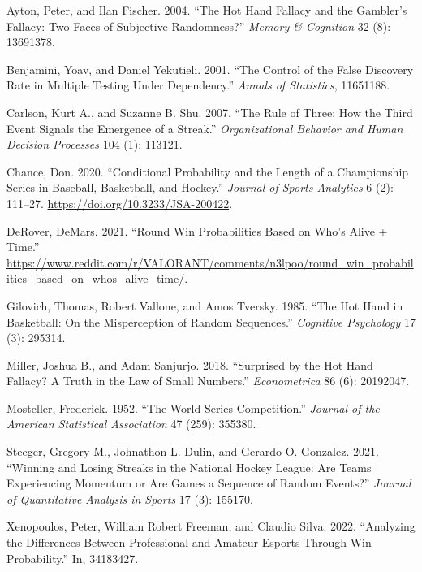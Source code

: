 \documentclass{article}
\newlength{\cslhangindent}
\newlength{\cslentryspacingunit} %
\newenvironment{CSLReferences}[2] %
 {%
  \setlength{\parindent}{0pt}
  \ifodd #1
  \let\oldpar\par
  \def\par{\hangindent=\cslhangindent\oldpar}
  \fi
  \setlength{\parskip}{#2\cslentryspacingunit}
 }%
 {}
\begin{document}
\hypertarget{refs}{}
\begin{CSLReferences}{1}{0}
\leavevmode{}%
Ayton, Peter, and Ilan Fischer. 2004. {``The Hot Hand Fallacy and the
Gambler{'}s Fallacy: Two Faces of Subjective Randomness?''} \emph{Memory
\& Cognition} 32 (8): 13691378.

\leavevmode{}%
Benjamini, Yoav, and Daniel Yekutieli. 2001. {``The Control of the False
Discovery Rate in Multiple Testing Under Dependency.''} \emph{Annals of
Statistics}, 11651188.

\leavevmode{}%
Carlson, Kurt A., and Suzanne B. Shu. 2007. {``The Rule of Three: How
the Third Event Signals the Emergence of a Streak.''}
\emph{Organizational Behavior and Human Decision Processes} 104 (1):
113121.

\leavevmode{}%
Chance, Don. 2020. {``Conditional Probability and the Length of a
Championship Series in Baseball, Basketball, and Hockey.''}
\emph{Journal of Sports Analytics} 6 (2): 111--27.
\url{https://doi.org/10.3233/JSA-200422}.

\leavevmode{}%
DeRover, DeMars. 2021. {``Round Win Probabilities Based on Who's Alive +
Time.''}
\url{https://www.reddit.com/r/VALORANT/comments/n3lpoo/round_win_probabilities_based_on_whos_alive_time/}.

\leavevmode{}%
Gilovich, Thomas, Robert Vallone, and Amos Tversky. 1985. {``The Hot
Hand in Basketball: On the Misperception of Random Sequences.''}
\emph{Cognitive Psychology} 17 (3): 295314.

\leavevmode{}%
Miller, Joshua B., and Adam Sanjurjo. 2018. {``Surprised by the Hot Hand
Fallacy? A Truth in the Law of Small Numbers.''} \emph{Econometrica} 86
(6): 20192047.

\leavevmode{}%
Mosteller, Frederick. 1952. {``The World Series Competition.''}
\emph{Journal of the American Statistical Association} 47 (259): 355380.

\leavevmode{}%
Steeger, Gregory M., Johnathon L. Dulin, and Gerardo O. Gonzalez. 2021.
{``Winning and Losing Streaks in the National Hockey League: Are Teams
Experiencing Momentum or Are Games a Sequence of Random Events?''}
\emph{Journal of Quantitative Analysis in Sports} 17 (3): 155170.

\leavevmode{}%
Xenopoulos, Peter, William Robert Freeman, and Claudio Silva. 2022.
{``Analyzing the Differences Between Professional and Amateur Esports
Through Win Probability.''} In, 34183427.

\end{CSLReferences}



\end{document}
